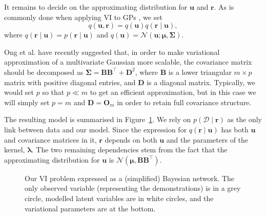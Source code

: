 \documentclass{mpaper}
\newcommand{\approximation}{q(\mathbf{u}, \mathbf{r})}
\begin{document}
It remains to decide on the approximating distribution for $\mathbf{u}$ and
$\mathbf{r}$. As is commonly done when applying VI to GPs
\cite{DBLP:conf/nips/ChengB17}, we set
\begin{equation} \label{eq:approximation}
  \approximation = q(\mathbf{u}) q(\mathbf{r} \mid \mathbf{u}),
\end{equation}
where $q(\mathbf{r} \mid \mathbf{u}) = p(\mathbf{r} \mid \mathbf{u})$ and
$q(\mathbf{u}) = \mathcal{N}(\mathbf{u}; \bm\mu, \bm\Sigma)$.

Ong et al. \cite{ong2018gaussian} have recently suggested that, in order to make
variational approximation of a multivariate Gaussian more scalable, the
covariance matrix should be decomposed as $\bm\Sigma =
\mathbf{B}\mathbf{B}^\intercal + \mathbf{D}^2$, where $\mathbf{B}$ is a lower
triangular $m \times p$ matrix with positive diagonal entries, and $\mathbf{D}$
is a diagonal matrix. Typically, we would set $p$ so that $p \ll m$ to get an
efficient approximation, but in this case we will simply set $p = m$ and
$\mathbf{D} = \mathbf{O}_m$ in order to retain full covariance structure.

The resulting model is summarised in Figure~\ref{fig:graphical_model}. We rely
on $p(\mathcal{D} \mid \mathbf{r})$ as the only link between data and our model.
Since the expression for $q(\mathbf{r} \mid \mathbf{u})$ has both $\mathbf{u}$
and covariance matrices in it, $\mathbf{r}$ depends on both $\mathbf{u}$ and the
parameters of the kernel, $\bm\lambda$. The two remaining dependencies stem from
the fact that the approximating distribution for $\mathbf{u}$ is
$\mathcal{N}(\bm\mu, \mathbf{BB}^\intercal)$.

\begin{figure}
  \centering
  \caption{Our VI problem expressed as a (simplified)
    Bayesian network. The only observed variable (representing the
    demonstrations) is in a grey circle, modelled latent variables are in white
    circles, and the variational parameters are at the bottom.}
  \label{fig:graphical_model}
\end{figure}
\end{document}
